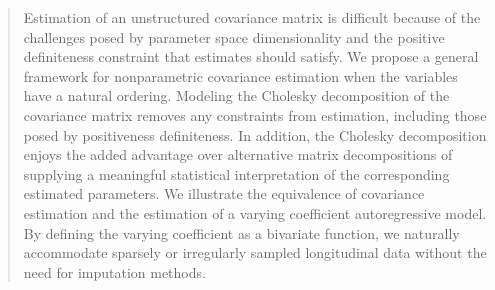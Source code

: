 

\begin{quote}
%
%

Estimation of an unstructured covariance matrix is difficult because of the challenges posed by parameter space dimensionality and the positive definiteness constraint that estimates should satisfy. We propose a general framework for nonparametric covariance estimation when the variables have a natural ordering. Modeling the Cholesky decomposition of the covariance matrix removes any constraints from estimation, including those posed by positiveness definiteness. In addition, the Cholesky decomposition enjoys the added advantage over alternative matrix decompositions of supplying a meaningful statistical interpretation of the corresponding estimated parameters. We illustrate the equivalence of covariance estimation and the estimation of a varying coefficient autoregressive model. By defining the varying coefficient as a bivariate function, we naturally accommodate sparsely or irregularly sampled longitudinal data without the need for imputation methods. 

\bigskip


\end{quote}

